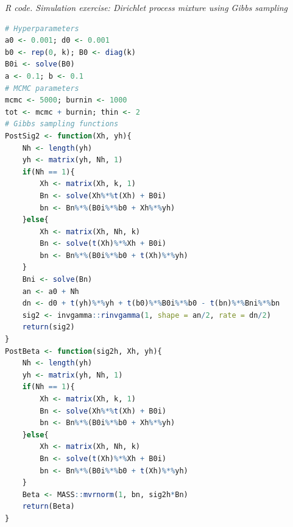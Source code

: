 \begin{tcolorbox}[enhanced,width=4.67in,center upper,
	fontupper=\large\bfseries,drop shadow southwest,sharp corners]
	\textit{R code. Simulation exercise: Dirichlet process mixture using Gibbs sampling}
	\begin{VF}
		\begin{lstlisting}[language=R]
# Hyperparameters
a0 <- 0.001; d0 <- 0.001
b0 <- rep(0, k); B0 <- diag(k)
B0i <- solve(B0)
a <- 0.1; b <- 0.1
# MCMC parameters
mcmc <- 5000; burnin <- 1000
tot <- mcmc + burnin; thin <- 2
# Gibbs sampling functions
PostSig2 <- function(Xh, yh){
	Nh <- length(yh)
	yh <- matrix(yh, Nh, 1)
	if(Nh == 1){
		Xh <- matrix(Xh, k, 1)
		Bn <- solve(Xh%*%t(Xh) + B0i)
		bn <- Bn%*%(B0i%*%b0 + Xh%*%yh)
	}else{
		Xh <- matrix(Xh, Nh, k)
		Bn <- solve(t(Xh)%*%Xh + B0i)
		bn <- Bn%*%(B0i%*%b0 + t(Xh)%*%yh)
	}
	Bni <- solve(Bn)
	an <- a0 + Nh
	dn <- d0 + t(yh)%*%yh + t(b0)%*%B0i%*%b0 - t(bn)%*%Bni%*%bn 
	sig2 <- invgamma::rinvgamma(1, shape = an/2, rate = dn/2)
	return(sig2)
}
PostBeta <- function(sig2h, Xh, yh){
	Nh <- length(yh)
	yh <- matrix(yh, Nh, 1)
	if(Nh == 1){
		Xh <- matrix(Xh, k, 1)
		Bn <- solve(Xh%*%t(Xh) + B0i)
		bn <- Bn%*%(B0i%*%b0 + Xh%*%yh)
	}else{
		Xh <- matrix(Xh, Nh, k)
		Bn <- solve(t(Xh)%*%Xh + B0i)
		bn <- Bn%*%(B0i%*%b0 + t(Xh)%*%yh)
	}
	Beta <- MASS::mvrnorm(1, bn, sig2h*Bn)
	return(Beta)
}
\end{lstlisting}
	\end{VF}
\end{tcolorbox}


